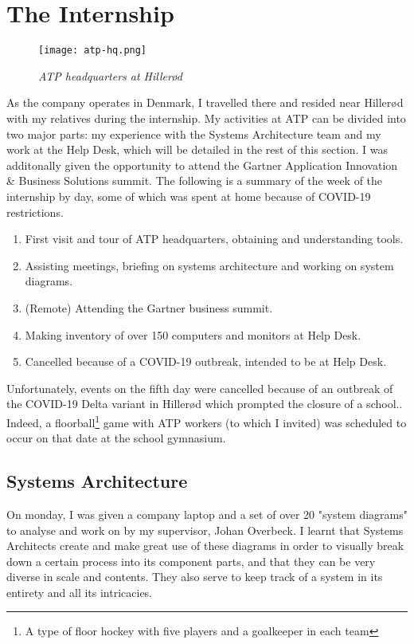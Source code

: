 \section{The Internship}

\begin{figure}[H]
    \centering
        \texttt{[image: atp-hq.png]}
        \caption*{\textit{ATP headquarters at Hillerød\cite{about_atp}}}
\end{figure}

As the company operates in Denmark, I travelled there and resided near Hillerød with my relatives during the internship. My activities at ATP can be divided into two major parts: my experience with the Systems Architecture team and my work at the Help Desk, which will be detailed in the rest of this section. I was additonally given the opportunity to attend the Gartner Application Innovation \& Business Solutions summit. The following is a summary of the week of the internship by day, some of which was spent at home because of COVID-19 restrictions.

\begin{enumerate}
    \item First visit and tour of ATP headquarters, obtaining and understanding tools.
    \item Assisting meetings, briefing on systems architecture and working on system diagrams.
    \item (Remote) Attending the Gartner business summit.
    \item Making inventory of over 150 computers and monitors at Help Desk.
    \item Cancelled because of a COVID-19 outbreak, intended to be at Help Desk.
\end{enumerate}

Unfortunately, events on the fifth day were cancelled because of an outbreak of the COVID-19 Delta variant in Hillerød which prompted the closure of a school.\cite{covid_rip}. Indeed, a floorball\footnote[0]{A type of floor hockey with five players and a goalkeeper in each team} game with ATP workers (to which I invited) was scheduled to occur on that date at the school gymnasium.

\subsection{Systems Architecture}

On monday, I was given a company laptop and a set of over 20 "system diagrams" to analyse and work on by my supervisor, Johan Overbeck. I learnt that Systems Architects create and make great use of these diagrams in order to visually break down a certain process into its component parts, and that they can be very diverse in scale and contents. They also serve to keep track of a system in its entirety and all its intricacies. 



